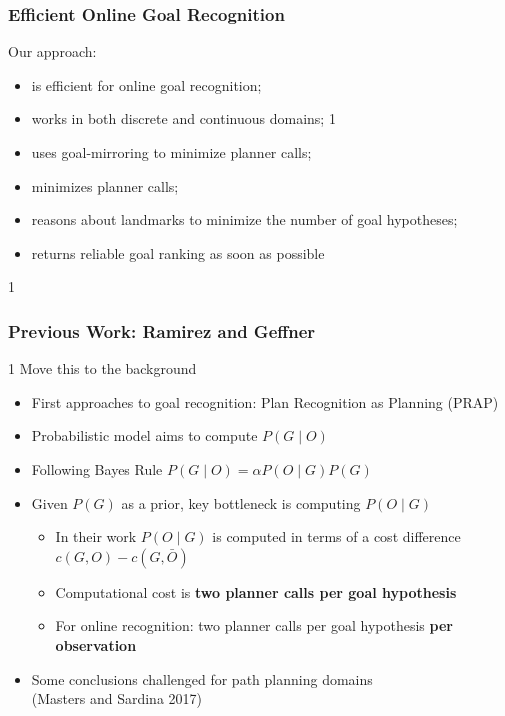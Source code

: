 \documentclass{beamer}
\newcommand{\todo}[1]{ {\color{red} #1} }
\def\masterclass{1}
\begin{document}
	\begin{frame}[c]\frametitle{Efficient Online Goal Recognition}
		Our approach:
		\begin{itemize}
			\item is efficient for online goal recognition;
			\item works in both discrete and continuous domains;
			\if\masterclass1
			\item uses goal-mirroring to minimize planner calls;
			\else
			\item minimizes planner calls;
			\fi
			\item reasons about landmarks to minimize the number of goal hypotheses; 
			\item returns reliable goal ranking as soon as possible
		\end{itemize}
	\end{frame}
	
\if\masterclass1
	\begin{frame}[c]\frametitle{Previous Work: Ramirez and Geffner}
		\if\masterclass1
		\todo{Move this to the background}
		\fi
		\begin{itemize}
			\item First approaches to goal recognition: Plan Recognition as Planning (PRAP)
			\item Probabilistic model aims to compute $P(G \mid O)$
			\item Following Bayes Rule $P(G \mid O) = \alpha P(O \mid G) P(G)$
			\item Given $P(G)$ as a prior, key bottleneck is computing $P(O \mid G)$
			\begin{itemize}
				\item In their work $P(O \mid G)$ is computed in terms of a cost difference $c(G,O) - c(G,\bar{O})$
				\item Computational cost is \textbf{two planner calls per goal hypothesis}
				\item For online recognition: two planner calls per goal hypothesis \textbf{per observation}
			\end{itemize}
			\item Some conclusions challenged for path planning domains\\ (Masters and Sardina 2017)
		\end{itemize}
	\end{frame}
	
\end{document}
